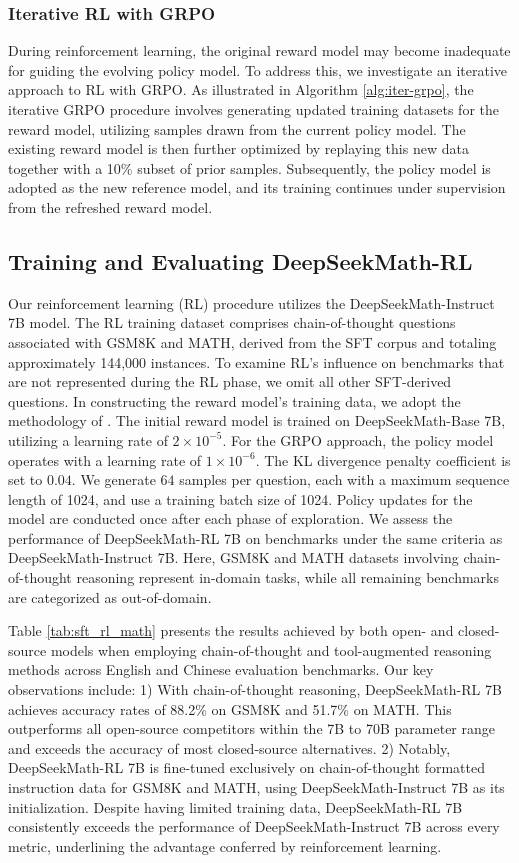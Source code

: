 \subsubsection{Iterative RL with GRPO} During reinforcement learning, the original reward model may become inadequate for guiding the evolving policy model. To address this, we investigate an iterative approach to RL with GRPO. As illustrated in Algorithm \ref{alg:iter-grpo}, the iterative GRPO procedure involves generating updated training datasets for the reward model, utilizing samples drawn from the current policy model. The existing reward model is then further optimized by replaying this new data together with a 10\% subset of prior samples. Subsequently, the policy model is adopted as the new reference model, and its training continues under supervision from the refreshed reward model.

\subsection{Training and Evaluating DeepSeekMath-RL}

Our reinforcement learning (RL) procedure utilizes the DeepSeekMath-Instruct 7B model. The RL training dataset comprises chain-of-thought questions associated with GSM8K and MATH, derived from the SFT corpus and totaling approximately 144,000 instances. To examine RL's influence on benchmarks that are not represented during the RL phase, we omit all other SFT-derived questions. In constructing the reward model's training data, we adopt the methodology of \citep{wang2023math}. The initial reward model is trained on DeepSeekMath-Base 7B, utilizing a learning rate of $2\times10^{-5}$. For the GRPO approach, the policy model operates with a learning rate of $1\times10^{-6}$. The KL divergence penalty coefficient is set to $0.04$. We generate $64$ samples per question, each with a maximum sequence length of 1024, and use a training batch size of 1024. Policy updates for the model are conducted once after each phase of exploration. We assess the performance of DeepSeekMath-RL 7B on benchmarks under the same criteria as DeepSeekMath-Instruct 7B. Here, GSM8K and MATH datasets involving chain-of-thought reasoning represent in-domain tasks, while all remaining benchmarks are categorized as out-of-domain.

Table \ref{tab:sft_rl_math} presents the results achieved by both open- and closed-source models when employing chain-of-thought and tool-augmented reasoning methods across English and Chinese evaluation benchmarks. Our key observations include: 1) With chain-of-thought reasoning, DeepSeekMath-RL 7B achieves accuracy rates of 88.2\% on GSM8K and 51.7\% on MATH. This outperforms all open-source competitors within the 7B to 70B parameter range and exceeds the accuracy of most closed-source alternatives. 2) Notably, DeepSeekMath-RL 7B is fine-tuned exclusively on chain-of-thought formatted instruction data for GSM8K and MATH, using DeepSeekMath-Instruct 7B as its initialization. Despite having limited training data, DeepSeekMath-RL 7B consistently exceeds the performance of DeepSeekMath-Instruct 7B across every metric, underlining the advantage conferred by reinforcement learning.

